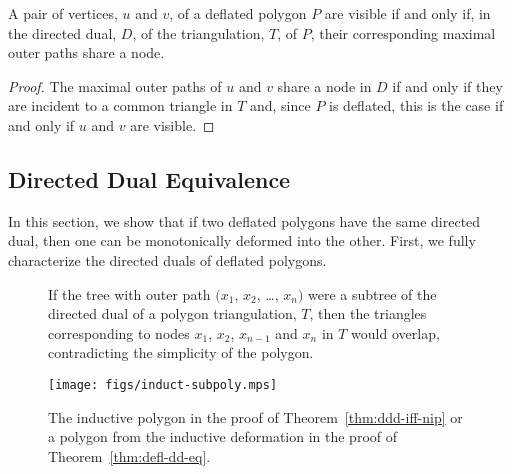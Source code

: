 \documentclass[11pt]{amsart}
\begin{document}
\begin{theorem}
  A pair of vertices, $u$ and $v$, of a deflated polygon $P$ are
  visible if and only if, in the directed dual, $D$, of the
  triangulation, $T$, of $P$, their corresponding maximal outer paths
  share a node.
\end{theorem}
\begin{proof}
  The maximal outer paths of $u$ and $v$ share a node in $D$ if and
  only if they are incident to a common triangle in $T$ and, since $P$
  is deflated, this is the case if and only if $u$ and $v$ are
  visible.
\end{proof}


\subsection{Directed Dual Equivalence}

In this section, we show that if two deflated polygons have the same
directed dual, then one can be monotonically deformed into the other.
First, we fully characterize the directed duals of deflated polygons.

\begin{figure}[htb]
  \centering {} \quad
  \caption{If \protect{} the tree with outer
    path $(x_1$, $x_2$, \ldots, $x_n)$ were a subtree of the directed
    dual of a polygon triangulation, $T$,
    then \protect{} the triangles
    corresponding to nodes $x_1$, $x_2$, $x_{n-1}$ and $x_n$ in $T$
    would overlap, contradicting the simplicity of the
    polygon.}  \label{fig:ill-path}
\end{figure}

\begin{figure}[htb]
  \centering
  \texttt{[image: figs/induct-subpoly.mps]}
  \caption{The inductive polygon in the proof of
    Theorem~\ref{thm:ddd-iff-nip} or a polygon from the inductive
    deformation in the proof of Theorem~\ref{thm:defl-dd-eq}.}
  \label{fig:no-ill-then-space}
\end{figure}
\end{document}
